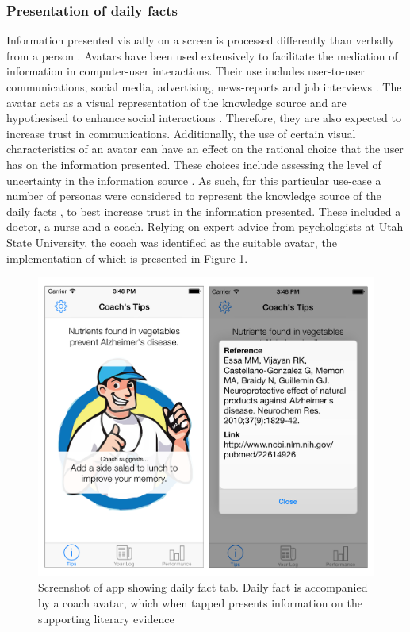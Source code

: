 \subsubsection{Presentation of daily facts}
Information presented visually on a screen is processed differently than verbally from a person \cite{Sundar2015}. Avatars have been used extensively to facilitate the mediation of information in computer-user interactions. Their use includes user-to-user communications, social media, advertising, news-reports and job interviews \cite{Sundar2015}. The avatar acts as a visual representation of the knowledge source \cite{Bente2008} and are hypothesised to enhance social interactions \cite{Blascovich2002}. Therefore, they are also expected to increase trust in communications. Additionally, the use of certain visual characteristics of an avatar can have an effect on the rational choice that the user has on the information presented. These choices include assessing the level of uncertainty in the information  source \cite{Afifi2000}. As such, for this particular use-case a number of personas were considered to represent the knowledge source of the daily facts \cite{Sundar2015}, to best increase trust in the information presented. These included a doctor, a nurse and a coach. Relying on expert advice from psychologists at Utah State University, the coach was identified as the suitable avatar, the implementation of which is presented in Figure \ref{fig: screenshot-dailyfact}.

\begin{figure}[h]
    \centering
    \includegraphics[scale=0.25, angle=0]{Files/prevention-study-1/figures/screenshot-dailyfact.png}
    \caption{Screenshot of app showing daily fact tab. Daily fact is accompanied by a coach avatar, which when tapped presents information on the supporting literary evidence}
    \label{fig: screenshot-dailyfact}
\end{figure}

